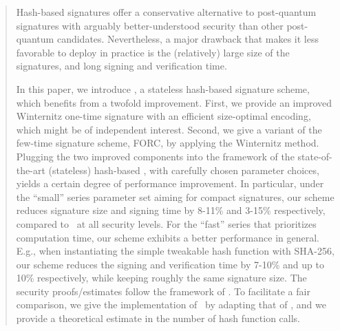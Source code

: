 \begin{abstract}
Hash-based signatures offer a conservative alternative to post-quantum signatures with arguably better-understood security than other post-quantum candidates. Nevertheless, a major drawback that makes it less favorable to deploy in practice is the (relatively) large size of the signatures, and long signing and verification time.

  In this paper,  we introduce \SPHINCSA, a stateless hash-based signature scheme, which benefits from a twofold improvement. First, we provide an improved Winternitz one-time signature with an efficient size-optimal encoding, which might be of independent interest. Second, we give a variant of the few-time signature scheme, FORC, by applying the  Winternitz method. Plugging the two improved components into the framework of the state-of-the-art (stateless) hash-based \SPHINCSP, with carefully chosen parameter choices, yields a certain degree of performance improvement. In particular, under the ``small'' series parameter set aiming for compact signatures, our scheme reduces signature size and signing time by 8-11\% and 3-15\% respectively, compared to \SPHINCSP\ at all security levels. For the ``fast'' series that prioritizes computation time, our scheme exhibits a better performance in general. E.g., when instantiating the simple tweakable hash function with SHA-256, our scheme reduces the signing and verification time by 7-10\% and up to 10\% respectively, while keeping roughly the same signature size. The security proofs/estimates follow the framework of \SPHINCSP. To facilitate a fair comparison, we give the implementation of  \SPHINCSA~by adapting that of \SPHINCSP, and we provide a theoretical estimate in the number of hash function calls. 
\end{abstract}